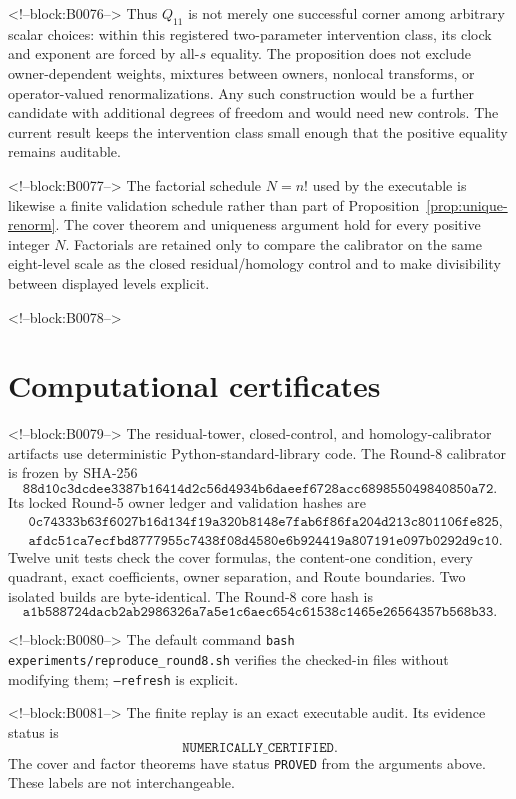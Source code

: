 \documentclass[11pt]{article}
\theoremstyle{definition}
\theoremstyle{remark}
\begin{document}
<!--block:B0076-->
Thus $Q_{11}$ is not merely one successful corner among arbitrary scalar choices: within this registered two-parameter intervention class, its clock and exponent are forced by all-$s$ equality. The proposition does not exclude owner-dependent weights, mixtures between owners, nonlocal transforms, or operator-valued renormalizations. Any such construction would be a further candidate with additional degrees of freedom and would need new controls. The current result keeps the intervention class small enough that the positive equality remains auditable.

<!--block:B0077-->
The factorial schedule $N=n!$ used by the executable is likewise a finite validation schedule rather than part of Proposition~\ref{prop:unique-renorm}. The cover theorem and uniqueness argument hold for every positive integer $N$. Factorials are retained only to compare the calibrator on the same eight-level scale as the closed residual/homology control and to make divisibility between displayed levels explicit.

<!--block:B0078-->
\section{Computational certificates}

<!--block:B0079-->
The residual-tower, closed-control, and homology-calibrator artifacts use deterministic Python-standard-library code. The Round-8 calibrator is frozen by SHA-256
\[
\texttt{88d10c3dcdee3387b16414d2c56d4934b6daeef6728acc689855049840850a72}.
\]
Its locked Round-5 owner ledger and validation hashes are
\begin{align*}
&\texttt{0c74333b63f6027b16d134f19a320b8148e7fab6f86fa204d213c801106fe825},\\
&\texttt{afdc51ca7ecfbd8777955c7438f08d4580e6b924419a807191e097b0292d9c10}.
\end{align*}
Twelve unit tests check the cover formulas, the content-one condition, every quadrant, exact coefficients, owner separation, and Route boundaries. Two isolated builds are byte-identical. The Round-8 core hash is
\[
\texttt{a1b588724dacb2ab2986326a7a5e1c6aec654c61538c1465e26564357b568b33}.
\]

<!--block:B0080-->
The default command \texttt{bash experiments/reproduce\_round8.sh} verifies the checked-in files without modifying them; \texttt{--refresh} is explicit.

<!--block:B0081-->
The finite replay is an exact executable audit. Its evidence status is
\[
\texttt{NUMERICALLY\_CERTIFIED}.
\]
The cover and factor theorems have status \texttt{PROVED} from the arguments above. These labels are not interchangeable.
\end{document}
